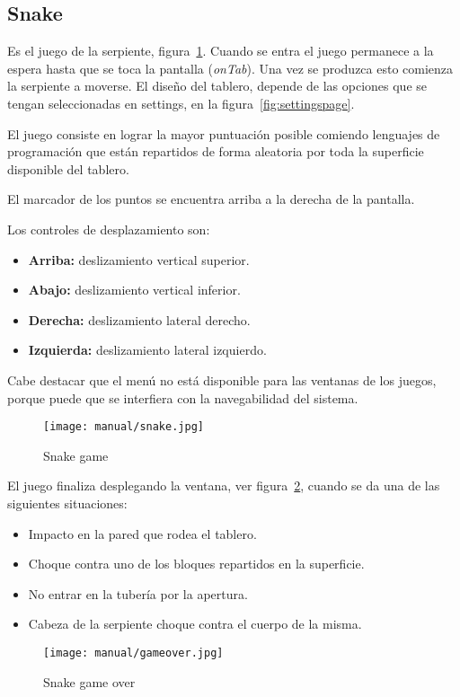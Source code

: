 \subsection{Snake}\label{snake}
Es el juego de la serpiente, figura~\ref{fig:snakepage}. Cuando se entra el juego permanece a la espera hasta que se toca la pantalla (\emph{onTab}). Una vez se produzca esto comienza la serpiente a moverse. El diseño del tablero, depende de las opciones que se tengan seleccionadas en settings, en la figura~\ref{fig:settingspage}.

El juego consiste en lograr la mayor puntuación posible comiendo lenguajes de programación que están repartidos de forma aleatoria por toda la superficie disponible del tablero.

El marcador de los puntos se encuentra arriba a la derecha de la pantalla.

Los controles de desplazamiento son:
\begin{itemize}
	\item \textbf{Arriba:} deslizamiento vertical superior.
	\item \textbf{Abajo:} deslizamiento vertical inferior.
	\item \textbf{Derecha:} deslizamiento lateral derecho.
	\item \textbf{Izquierda:} deslizamiento lateral izquierdo.
\end{itemize}

Cabe destacar que el menú no está disponible para las ventanas de los juegos, porque puede que se interfiera con la navegabilidad del sistema.

\begin{figure}[H]
	\centering
	\texttt{[image: manual/snake.jpg]}
	\caption{Snake game}\label{fig:snakepage}
\end{figure}

El juego finaliza desplegando la ventana, ver figura~\ref{fig:gameover}, cuando se da una de las siguientes situaciones:
\begin{itemize}
	\item Impacto en la pared que rodea el tablero.
	\item Choque contra uno de los bloques repartidos en la superficie.
	\item No entrar en la tubería por la apertura.
	\item Cabeza de la serpiente choque contra el cuerpo de la misma.
\end{itemize}

\begin{figure}[H]
	\centering
	\texttt{[image: manual/gameover.jpg]}
	\caption{Snake game over}\label{fig:gameover}
\end{figure}

